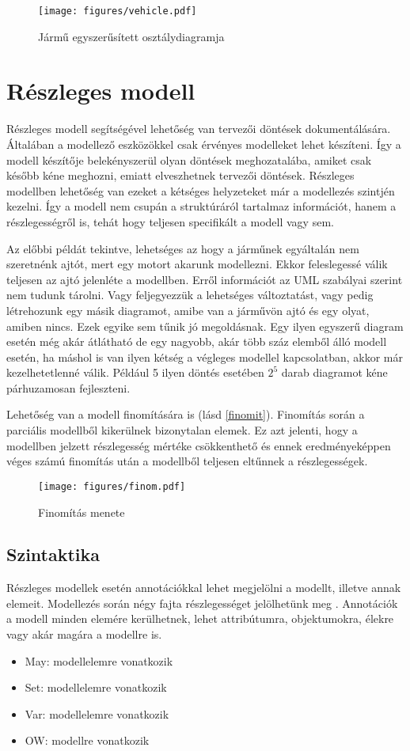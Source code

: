 \begin{figure}[!ht]
	\centering
	\texttt{[image: figures/vehicle.pdf]}
	\caption{Jármű egyszerűsített osztálydiagramja} 
	\label{jarmu}
\end{figure}

\section{Részleges modell}
Részleges modell segítségével lehetőség van tervezői döntések dokumentálására. Általában a modellező eszközökkel csak érvényes modelleket lehet készíteni. Így a modell készítője belekényszerül olyan döntések meghozatalába, amiket csak később kéne meghozni, emiatt elveszhetnek tervezői döntések. Részleges modellben lehetőség van ezeket a kétséges helyzeteket már a modellezés szintjén kezelni. Így a modell nem csupán a struktúráról tartalmaz információt, hanem a részlegességről is, tehát hogy teljesen specifikált a modell vagy sem. 
\par
Az előbbi példát tekintve, lehetséges az hogy a járműnek egyáltalán nem szeretnénk ajtót, mert egy motort akarunk modellezni. Ekkor feleslegessé válik teljesen az ajtó jelenléte a modellben. Erről információt az UML szabályai szerint nem tudunk tárolni. Vagy feljegyezzük a lehetséges változtatást, vagy pedig létrehozunk egy másik diagramot, amibe van a járművön ajtó és egy olyat, amiben nincs. Ezek egyike sem tűnik jó megoldásnak. Egy ilyen egyszerű diagram esetén még akár átlátható de egy nagyobb, akár több száz elemből álló modell esetén, ha máshol is van ilyen kétség a végleges modellel kapcsolatban, akkor már kezelhetetlenné válik. Például 5 ilyen döntés esetében $2^{5}$ darab diagramot kéne párhuzamosan fejleszteni.
\par
Lehetőség van a modell finomítására is (lásd \autoref{finomit}). Finomítás során a parciális modellből kikerülnek bizonytalan elemek. Ez azt jelenti, hogy a modellben jelzett részlegesség mértéke csökkenthető és ennek eredményeképpen véges számú finomítás után a modellből teljesen eltűnnek a részlegességek.

\begin{figure}[!ht]
	\centering
	\texttt{[image: figures/finom.pdf]}
	\caption{Finomítás menete} 
	\label{finomit}
\end{figure}

\subsection{Szintaktika}
Részleges modellek esetén annotációkkal lehet megjelölni a modellt, illetve annak elemeit. Modellezés során négy fajta részlegességet jelölhetünk meg \cite{Salay}. Annotációk a modell minden elemére kerülhetnek, lehet attribútumra, objektumokra, élekre vagy akár magára a modellre is.
\begin{itemize}  
	\item May: modellelemre vonatkozik
	\item Set: modellelemre vonatkozik
	\item Var: modellelemre vonatkozik
	\item OW: modellre vonatkozik
\end{itemize}



